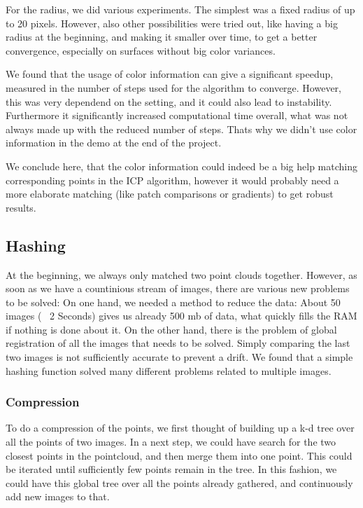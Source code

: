 \documentclass[10pt,twocolumn,letterpaper]{article}
\begin{document}
For the radius, we did various experiments. The simplest was a fixed radius of up to 20 pixels. However, also other
possibilities were tried out, like having a big radius at the beginning, and making it smaller over time, to get a
better convergence, especially on surfaces without big color variances.

We found that the usage of color information can give a significant speedup, measured in the number of steps used for the
algorithm to converge. However, this was very dependend on the setting, and it could also lead to instability.
Furthermore it significantly increased computational time overall, what was not always made up with the reduced number of
steps. Thats why we didn't use color information in the demo at the end of the project.

We conclude here, that the color information could indeed be a big help matching corresponding points in the ICP algorithm,
however it would probably need a more elaborate matching (like patch comparisons or gradients) to get robust results.

\subsection{Hashing}
At the beginning, we always only matched two point clouds together. However, as soon as we have a countinious stream of images,
there are various new problems to be solved: On one hand, we needed a method to reduce the data: About 50 images (~ 2 Seconds)
gives us already 500 mb of data, what quickly fills the RAM if nothing is done about it. On the other hand, there is the problem
of global registration of all the images that needs to be solved. Simply comparing the last two images is not sufficiently accurate
to prevent a drift. We found that a simple hashing function solved many different problems related to multiple images.

\subsubsection{Compression}
To do a compression of the points, we first thought of building up a k-d tree over all the points of two images. In a next step, we could have
search for the two closest points in the pointcloud, and then merge them into one point. This could be iterated until sufficiently few
points remain in the tree. In this fashion, we could have this global tree over all the points already gathered, and continuously add new
images to that.
\end{document}
